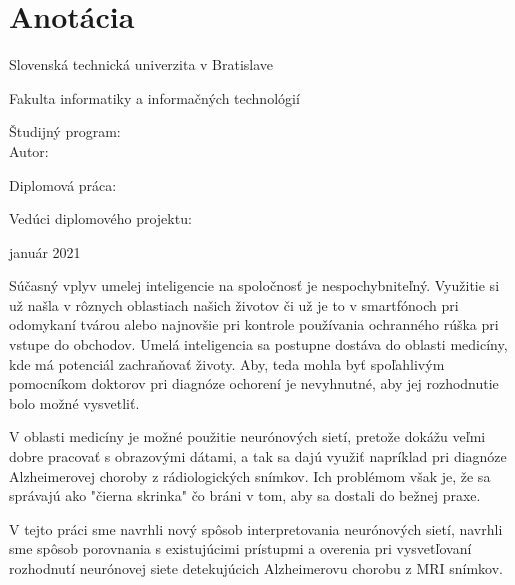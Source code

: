
\thispagestyle{empty}
\section*{Anotácia}

\begin{minipage}[t]{1\columnwidth}%
Slovenská technická univerzita v Bratislave

Fakulta informatiky a informačných technológií

Študijný program: \myStudyProgram\\

Autor: \myName

Diplomová práca: \myTitle

Vedúci diplomového projektu: \mySupervisor

január 2021
\end{minipage}

\bigskip{}

Súčasný vplyv umelej inteligencie na spoločnosť je nespochybniteľný. Využitie si už našla v rôznych oblastiach našich životov či už je to v smartfónoch pri odomykaní tvárou alebo najnovšie pri kontrole používania ochranného rúška pri vstupe do obchodov. Umelá inteligencia sa postupne dostáva do oblasti medicíny, kde má potenciál zachraňovať životy. Aby, teda mohla byť spoľahlivým pomocníkom doktorov pri diagnóze ochorení je nevyhnutné, aby jej rozhodnutie bolo možné vysvetliť. 

V oblasti medicíny je možné použitie neurónových sietí, pretože dokážu veľmi dobre pracovať s obrazovými dátami, a tak sa dajú využiť napríklad pri diagnóze Alzheimerovej choroby z rádiologických snímkov. Ich problémom však je, že sa správajú ako "čierna skrinka" čo bráni v tom, aby sa dostali do bežnej praxe.

V tejto práci sme navrhli nový spôsob interpretovania neurónových sietí, navrhli sme spôsob porovnania s existujúcimi prístupmi a overenia pri vysvetľovaní rozhodnutí neurónovej siete detekujúcich Alzheimerovu chorobu z MRI snímkov.

\newpage
\thispagestyle{empty}
\mbox{}
\newpage